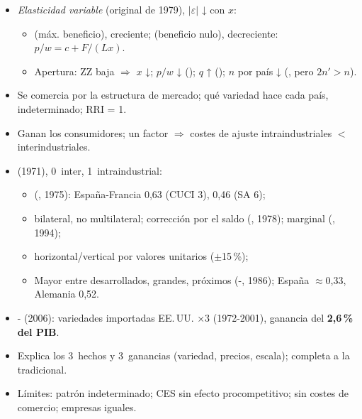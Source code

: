 \documentclass{article}
\begin{document}
\begin{columnas}
\begin{itemize}
\begin{itemize}
  \item gráficamente, tangencia de  .
  \end{itemize}
\item \emph{Elasticidad variable} (original de 1979), $|\varepsilon|$ ↓ con $x$:
  \begin{itemize}
  \item {} (máx. beneficio), creciente;  (beneficio nulo), decreciente: $p/w=c+F/(Lx)$.
  \item Apertura: ZZ baja $\Rightarrow$ $x$ ↓; $p/w$ ↓ (); $q$ ↑ (); $n$ por país ↓ (, pero $2n'>n$).
  \end{itemize}
\end{itemize}
\begin{itemize}
\item Se comercia por la estructura de mercado; qué variedad hace cada país, indeterminado; RRI = 1.
\item Ganan los consumidores; un factor $\Rightarrow$ costes de ajuste intraindustriales $<$ interindustriales.
\end{itemize}
\begin{itemize}
\item {} (1971), 0~inter, 1~intraindustrial:
  \begin{itemize}
  \item {} (, 1975): España-Francia 0,63 (CUCI 3), 0,46 (SA 6);
  \item bilateral, no multilateral; corrección por el saldo (, 1978); marginal (, 1994);
  \item horizontal/vertical por valores unitarios ($\pm$15\,\%);
  \item Mayor entre desarrollados, grandes, próximos (-, 1986); España $\approx$0,33, Alemania 0,52.
  \end{itemize}
\item {}- (2006): variedades importadas EE.\,UU. ×3 (1972-2001), ganancia del \textbf{2,6\,\% del PIB}.
\end{itemize}
\begin{itemize}
\item Explica los 3~hechos y 3~ganancias (variedad, precios, escala); completa a la tradicional.
\item Límites: patrón indeterminado; CES sin efecto procompetitivo; sin costes de comercio; empresas iguales.
\end{itemize}


\end{columnas}
\end{document}
